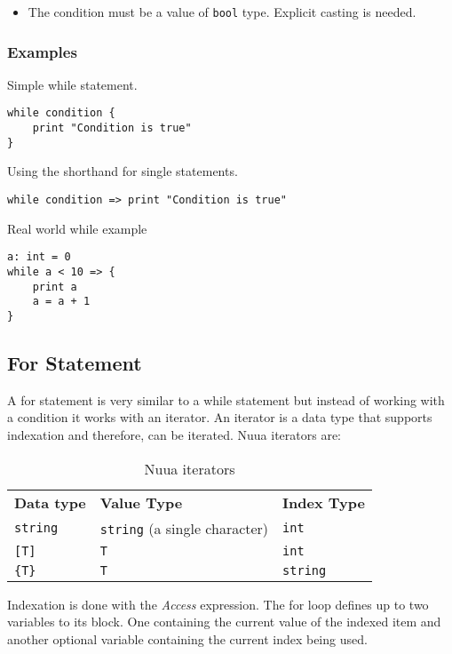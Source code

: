\begin{itemize}
    \item The condition must be a value of \texttt{bool} type. Explicit casting is needed.
\end{itemize}

\subsubsection{Examples}

Simple while statement.
\begin{verbatim}
while condition {
    print "Condition is true"
}
\end{verbatim}
Using the shorthand for single statements.
\begin{verbatim}
while condition => print "Condition is true"
\end{verbatim}
Real world while example
\begin{verbatim}
a: int = 0
while a < 10 => {
    print a
    a = a + 1
}
\end{verbatim}

\subsection{For Statement}

A for statement is very similar to a while statement but instead of working with a condition it works with an iterator.
An iterator is a data type that supports indexation and therefore, can be iterated. Nuua iterators are:

\begin{table}[H]
    \centering
    \begin{tabular}{ l l l }
        \textbf{Data type} & \textbf{Value Type} & \textbf{Index Type} \\
        \texttt{string} & \texttt{string} (a single character) & \texttt{int} \\
        \texttt{[T]}& \texttt{T} & \texttt{int} \\
        \texttt{\{T\}} & \texttt{T} & \texttt{string} \\
    \end{tabular}
    \caption{Nuua iterators}
    \label{fig:nuua_iterators}
\end{table}

Indexation is done with the \emph{Access} expression.
The for loop defines up to two variables to its block. One containing the current value of the indexed item and
another optional variable containing the current index being used.


